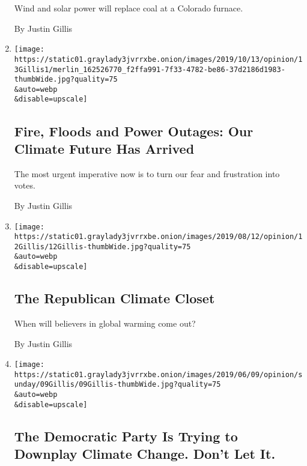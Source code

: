 \begin{enumerate}
  Wind and solar power will replace coal at a Colorado furnace.

  By Justin Gillis
\item
  \href{/2019/10/12/opinion/sunday/california-power-outage-climate.html}{}

  \texttt{[image: https://static01.graylady3jvrrxbe.onion/images/2019/10/13/opinion/13Gillis1/merlin\_162526770\_f2ffa991-7f33-4782-be86-37d2186d1983-thumbWide.jpg?quality=75\\\&auto=webp\\\&disable=upscale]}

  \hypertarget{fire-floods-and-power-outages-our-climate-future-has-arrived}{%
  \subsection{Fire, Floods and Power Outages: Our Climate Future Has
  Arrived}\label{fire-floods-and-power-outages-our-climate-future-has-arrived}}

  The most urgent imperative now is to turn our fear and frustration
  into votes.

  By Justin Gillis
\item
  \href{/2019/08/12/opinion/republicans-environment.html}{}

  \texttt{[image: https://static01.graylady3jvrrxbe.onion/images/2019/08/12/opinion/12Gillis/12Gillis-thumbWide.jpg?quality=75\\\&auto=webp\\\&disable=upscale]}

  \hypertarget{the-republican-climate-closet}{%
  \subsection{The Republican Climate
  Closet}\label{the-republican-climate-closet}}

  When will believers in global warming come out?

  By Justin Gillis
\item
  \href{/2019/06/07/opinion/democrats-climate-change.html}{}

  \texttt{[image: https://static01.graylady3jvrrxbe.onion/images/2019/06/09/opinion/sunday/09Gillis/09Gillis-thumbWide.jpg?quality=75\\\&auto=webp\\\&disable=upscale]}

  \hypertarget{the-democratic-party-is-trying-to-downplay-climate-change-dont-let-it}{%
  \subsection{The Democratic Party Is Trying to Downplay Climate Change.
  Don't Let
  It.}\label{the-democratic-party-is-trying-to-downplay-climate-change-dont-let-it}}


\end{enumerate}
